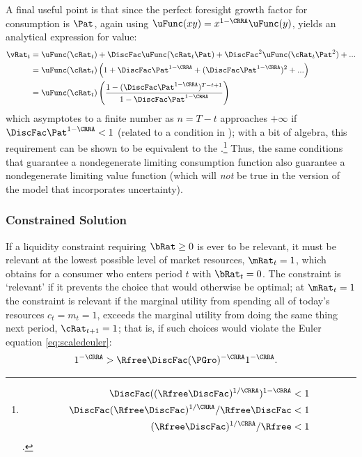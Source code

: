 \documentclass[./BufferStockTheory.tex]{subfiles}
\begin{document}
\hypertarget{ValuePFAnalytical}{}
A final useful point is that since the perfect foresight
growth factor for consumption is $\Pat$, again using $\uFunc(xy) =
x^{1-\CRRA}\uFunc(y)$, yields an analytical expression for value:  
\begin{equation}\begin{gathered}\begin{aligned}
  \vRat_{t}  & = \uFunc(\cRat_{t})+\DiscFac \uFunc(\cRat_{t}\Pat)+\DiscFac^{2} \uFunc(\cRat_{t} \Pat^{2})+... \label{eq:ValuePFAnalytical}
\\  & = \uFunc(\cRat_{t})\left(1+\DiscFac \Pat^{1-\CRRA}+(\DiscFac \Pat^{1-\CRRA})^{2}+...\right) \notag 
\\  & = \uFunc(\cRat_{t})\left(\frac{1-(\DiscFac \Pat^{1-\CRRA})^{T-t+1}}{1-\DiscFac \Pat^{1-\CRRA}}\right) \notag
\end{aligned}\end{gathered}\end{equation}
which asymptotes to a finite number as $n=T-t$ approaches $+\infty$ if $\DiscFac \Pat^{1-\CRRA} < 1$ (related to a condition in \cite{asHomogeneous}); with a bit of algebra, this requirement can be shown to be equivalent to the \RIC.\footnote{
\begin{align*}
   \DiscFac ((\Rfree \DiscFac)^{1/\CRRA})^{1-\CRRA}  & < 1
\\ \DiscFac (\Rfree\DiscFac)^{1/\CRRA}/\Rfree\DiscFac  & < 1
\\ (\Rfree \DiscFac)^{1/\CRRA} /\Rfree  & < 1
\end{align*}.
}  Thus, the same conditions that guarantee a nondegenerate limiting consumption function also guarantee a nondegenerate limiting value function (which will \textit{not} be true in the version of the model that incorporates uncertainty).


\hypertarget{Constrained-Solution}{}
\subsubsection{Constrained Solution}

If a liquidity constraint requiring $\bRat \geq 0$ is ever to be relevant, it must be
relevant at the lowest possible level of market resources,
$\mRat_{t}=1$, which obtains for a consumer who enters period $t$ with
$\bRat_{t}=0$.  The constraint is `relevant' if
it prevents the choice that would otherwise be optimal; at
$\mRat_{t}=1$ the constraint is relevant if the marginal utility from spending all of today's
resources $c_{t}=m_{t}=1$, exceeds the marginal utility from
doing the same thing next period, $\cRat_{t+1}=1$; that is, if such
choices would violate the Euler equation \eqref{eq:scaledeuler}:
\begin{equation}\begin{gathered}\begin{aligned}
    1^{-\CRRA}  & > \Rfree \DiscFac (\PGro)^{-\CRRA}1^{-\CRRA}  \label{eq:LiqConstrBinds}.
\end{aligned}\end{gathered}\end{equation}
\end{document}

